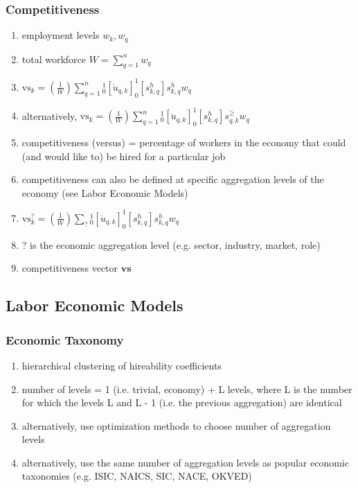 \documentclass{elsarticle} %
\begin{document}
\subsubsection{Competitiveness}
\begin{enumerate}
    \item employment levels $w_k, w_q$
    \item total workforce $W = \sum_{q=1}^{n}{w_q}$
    \item $\text{vs}_k = \left(\frac{1}{W}\right) \sum_{q=1}^{n}{_{0}^{1}[\ddot{u}_{q,k}] _{0}^{1}[s_{k,q}^{h}] s_{k,q}^{h} w_q}$
    \item alternatively, $\text{vs}_k = \left(\frac{1}{W}\right)
              \sum_{q=1}^{n}{_{0}^{1}[\ddot{u}_{q,k}] _{0}^{1}[s_{k,q}^{h}] s_{q,k}^{\geq} w_q}$
    \item competitiveness (versus) = percentage of workers in the economy that could (and
          would like to) be hired for a particular job
    \item competitiveness can also be defined at specific aggregation levels of the
          economy (see Labor Economic Models)
    \item $\text{vs}_{k}^{?} = \left(\frac{1}{W}\right) \sum_{?}{_{0}^{1}[\ddot{u}_{q,k}] _{0}^{1}[s_{k,q}^{h}] s_{k,q}^{h} w_q}$
    \item ? is the economic aggregation level (e.g. sector, industry, market, role)
    \item competitiveness vector $\textbf{vs}$
\end{enumerate}

\subsection{Labor Economic Models}
\subsubsection{Economic Taxonomy}
\begin{enumerate}
    \item hierarchical clustering of hireability coefficients
    \item number of levels = 1 (i.e. trivial, economy) + L levels, where L is the number
          for which the levels L and L - 1 (i.e. the previous aggregation) are identical
    \item alternatively, use optimization methods to choose number of aggregation levels
    \item alternatively, use the same number of aggregation levels as popular economic
          taxonomies (e.g. ISIC, NAICS, SIC, NACE, OKVED)
\end{enumerate}
\end{document}
